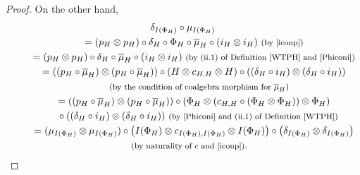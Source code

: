 \documentclass[10pt,a4paper]{amsart}
\numberwithin{equation}{section}
\begin{document}
\begin{proof}
On the other hand,
\begin{gather*}
 \delta_{I(\Phi_{H})}\circ\mu_{I(\Phi_{H})}\\
 \qquad{}= (p_{H}\otimes p_{H})\circ\delta_{H}\circ\Phi_{H}\circ\overline{\mu}_{H}\circ (i_{H}\otimes i_{H})\ \text{\footnotesize\textnormal{(by \eqref{iconp})}}\\
 \qquad{}= (p_{H}\otimes p_{H})\circ\delta_{H}\circ\overline{\mu}_{H}\circ(i_{H}\otimes i_{H})\ \text{\footnotesize\textnormal{(by (ii.1) of Definition \ref{WTPH} and \eqref{Phiconi})}}\\
 \qquad{}= ((p_{H}\circ\overline{\mu}_{H})\otimes(p_{H}\circ\overline{\mu}_{H}))\circ(H\otimes c_{H,H}\otimes H)\circ((\delta_{H}\circ i_{H})\otimes(\delta_{H}\circ i_{H}))\\
 \qquad\quad{}\ \text{\footnotesize\textnormal{(by the condition of coalgebra morphism for $\overline{\mu}_{H}$)}}\\
 \qquad{}= ((p_{H}\circ\overline{\mu}_{H})\otimes(p_{H}\circ\overline{\mu}_{H}))\circ(\Phi_{H}\otimes (c_{H,H}\circ(\Phi_{H}\otimes \Phi_{H}))\otimes \Phi_{H})\\
 \qquad\quad{} \circ((\delta_{H}\circ i_{H})\otimes(\delta_{H}\circ i_{H}))\ \text{\footnotesize\textnormal{(by \eqref{Phiconi} and (ii.1) of Definition \ref{WTPH})}}\\
 \qquad{}= (\mu_{I(\Phi_{H})}\otimes\mu_{I(\Phi_{H})})\circ\bigl(I(\Phi_{H})\otimes c_{I(\Phi_{H}),I(\Phi_{H})}\otimes I(\Phi_{H})\bigr)\circ\bigl(\delta_{I(\Phi_{H})}\otimes\delta_{I(\Phi_{H})}\bigr)\\
 \qquad\quad{}\ \text{\footnotesize\textnormal{(by naturality of $c$ and \eqref{iconp})}}.\tag*{\qed}
\end{gather*}
\renewcommand{\qed}{}
\end{proof}
\end{document}
